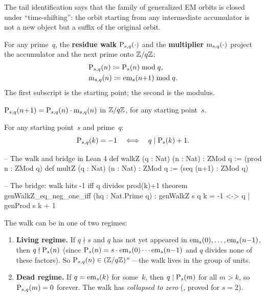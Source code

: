 \noindent The tail identification says that the family of
generalized EM orbits is closed under ``time-shifting'': the orbit
starting from any intermediate accumulator is not a new object but a
suffix of the original orbit.

\begin{definition}\label{def:walk-mult}
For any prime~$q$, the \textbf{residue walk} $\mathrm{P}_{s,q}(\cdot)$ and the
\textbf{multiplier} $\mathrm{m}_{s,q}(\cdot)$ project the accumulator and the
next prime onto $\mathbb{Z}/q\mathbb{Z}$:
$$\begin{aligned}\label{eq:walk}
  &\mathrm{P}_{s,q}(n) \coloneqq \mathrm{P}_{s}(n) \bmod q, \\
  &\mathrm{m}_{s,q}(n) \coloneqq \mathrm{em}_{s}(n{+}1) \bmod q.
\end{aligned}$$
The first subscript is the starting point; the second is the modulus.
\end{definition}

\begin{proposition}\label{prop:recurrence}
$\mathrm{P}_{s,q}(n\!+\!1) = \mathrm{P}_{s,q}(n) \cdot \mathrm{m}_{s,q}(n)$ in
$\mathbb{Z}/q\mathbb{Z}$, for any starting point~$s$.
\end{proposition}

\begin{theorem}\label{thm:bridge}
For any starting point~$s$ and prime~$q$:
\[
  \mathrm{P}_{s,q}(k) = -1
  \quad\Longleftrightarrow\quad
  q \mid \mathrm{P}_{s}(k) + 1.
\]
\end{theorem}

\begin{leancode}
-- The walk and bridge in Lean 4
def walkZ (q : Nat) (n : Nat) : ZMod q := (prod n : ZMod q)
def multZ (q : Nat) (n : Nat) : ZMod q := (seq (n+1) : ZMod q)

-- The bridge: walk hits -1 iff q divides prod(k)+1
theorem genWalkZ_eq_neg_one_iff (hq : Nat.Prime q) :
    genWalkZ s q k = -1 <-> q | genProd s k + 1
\end{leancode}

\noindent The walk can be in one of two regimes:

\begin{enumerate}[nosep]
\item \textbf{Living regime.}  If $q \nmid s$ and $q$ has not yet appeared in
  $\mathrm{em}_{s}(0), \ldots, \mathrm{em}_{s}(n{-}1)$, then $q \nmid \mathrm{P}_{s}(n)$
  (since $\mathrm{P}_{s}(n) = s \cdot \mathrm{em}_{s}(0) \cdots \mathrm{em}_{s}(n{-}1)$
  and $q$ divides none of these factors).
  So $\mathrm{P}_{s,q}(n) \in (\mathbb{Z}/q\mathbb{Z})^\times$---the walk lives
  in the group of units.

\item \textbf{Dead regime.}  If $q = \mathrm{em}_{s}(k)$ for some~$k$,
  then $q \mid \mathrm{P}_{s}(m)$ for all $m > k$, so $\mathrm{P}_{s,q}(m) = 0$
  forever.  The walk has \emph{collapsed to zero}
  (,
  proved for $s = 2$).
\end{enumerate}

